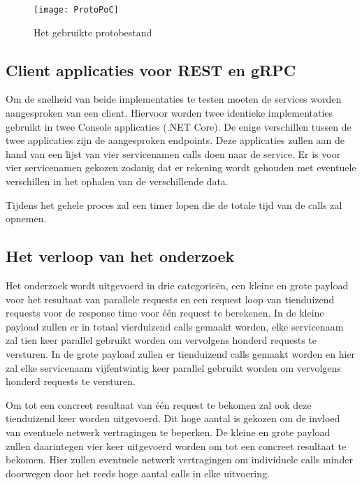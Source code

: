 \begin{figure}[H]
    \centering
    \texttt{[image: ProtoPoC]}
    \caption[Proof-Of-Concept protobestand]{Het gebruikte protobestand}
    \label{fig:ProtoPoC}
\end{figure}

\subsection{Client applicaties voor REST en gRPC}
\label{subsec:Client applicaties voor REST en gRPC}

Om de snelheid van beide implementaties te testen moeten de services worden aangesproken van een client. Hiervoor worden twee identieke implementaties gebruikt in twee Console applicaties (.NET Core). De enige verschillen tussen de twee applicaties zijn de aangesproken endpoints. Deze applicaties zullen aan de hand van een lijst van vier servicenamen calls doen naar de service. Er is voor vier servicenamen gekozen zodanig dat er rekening wordt gehouden met eventuele verschillen in het ophalen van de verschillende data.

Tijdens het gehele proces zal een timer lopen die de totale tijd van de calls zal opnemen.

\subsection{Het verloop van het onderzoek}
\label{subsec:Het verloop van het onderzoek}

Het onderzoek wordt uitgevoerd in drie categorieën, een kleine en grote payload voor het resultaat van parallele requests en een request loop van tienduizend requests voor de response time voor één request te berekenen. In de kleine payload zullen er in totaal vierduizend calls gemaakt worden, elke servicenaam zal tien keer parallel gebruikt worden om vervolgens honderd requests te versturen. In de grote payload zullen er tienduizend calls gemaakt worden en hier zal elke servicenaam vijfentwintig keer parallel gebruikt worden om vervolgens honderd requests te versturen.

Om tot een concreet resultaat van één request te bekomen zal ook deze tienduizend keer worden uitgevoerd. Dit hoge aantal is gekozen om de invloed van eventuele netwerk vertragingen te beperken.
De kleine en grote payload zullen daarintegen vier keer uitgevoerd worden om tot een concreet resultaat te bekomen. Hier zullen eventuele netwerk vertragingen om individuele calls minder doorwegen door het reeds hoge aantal calls in elke uitvoering.


